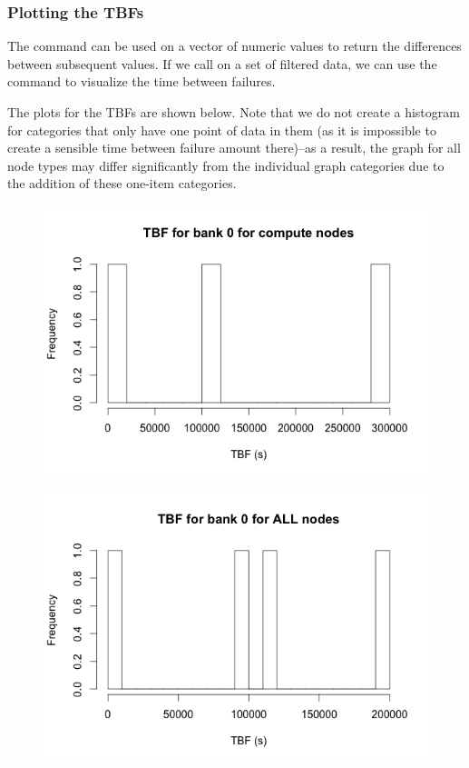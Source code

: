\subsubsection{Plotting the TBFs}

The  command can be used on a vector of numeric values to return the differences between subsequent values.  If we call  on a set of filtered data, we can use the  command to visualize the time between failures.

The plots for the TBFs are shown below.  Note that we do not create a histogram for categories that only have one point of data in them (as it is impossible to create a sensible time between failure amount there)--as a result, the graph for all node types may differ significantly from the individual graph categories due to the addition of these one-item categories.


\begin{figure}[h]
\centering
\includegraphics{images/tbf_0_c.png}
\end{figure}

\begin{figure}[h]
\centering
\includegraphics{images/tbf_0_a.png}
\end{figure}


